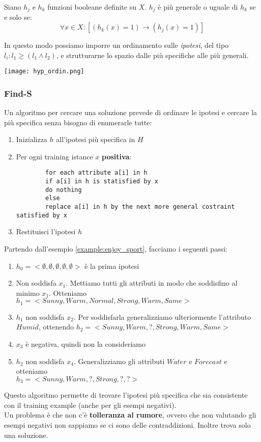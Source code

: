 \begin{definition}
	Siano $h_j$ e $h_k$ funzioni booleane definite su $X$. $h_j$ è più generale o uguale di $h_k$ se e solo se:
	\begin{equation}
		\forall x \in X : [(h_k(x) = 1) \to (h_j(x)=1)]
	\end{equation}
\end{definition}
In questo modo possiamo imporre un ordinamento sulle \textit{ipotesi}, del tipo $l_i : l_1 \geq (l_1 \land l_2)$, e strutturarne lo spazio dalle più specifiche alle più generali.
\begin{center}
	\texttt{[image: hyp\_ordin.png]}
\end{center}
\subsubsection{Find-S}
Un algoritmo per cercare una soluzione prevede di ordinare le ipotesi e cercare la più specifica senza bisogno di enumerarle tutte:
\begin{enumerate}
	\item Inizializza $h$ all'ipotesi più specifica in $H$
	\item Per ogni training istance $x$ \textbf{positiva}:
	\begin{lstlisting}
		for each attribute a[i] in h
		if a[i] in h is statisfied by x
		do nothing
		else
		replace a[i] in h by the next more general costraint satisfied by x
	\end{lstlisting}
	\item Restituisci l'ipotesi $h$
\end{enumerate}
\begin{example}
	Partendo dall'esempio \ref{example:enjoy_sport}, facciamo i seguenti passi:
	\begin{enumerate}
		\item $h_0=<\emptyset,\emptyset,\emptyset,\emptyset,\emptyset>$ è la prima ipotesi
		\item Non soddisfa $x_1$. Mettiamo tutti gli attributi in modo che soddisfino al minimo $x_1$. Otteniamo $h_1=<Sunny,Warm,Normal,Strong,Warm,Same>$
		\item $h_1$ non soddisfa $x_2$. Per soddisfarla generalizziamo ulteriormente l'attributo $Humid$, ottenendo $h_2=<Sunny,Warm,?,Strong,Warm,Same>$
		\item $x_3$ è negativa, quindi non la consideriamo
		\item $h_2$ non soddisfa $x_4$. Generalizziamo gli attributi $Water$ e $Forecast$ e otteniamo \\$h_3=<Sunny,Warm,?,Strong,?,?>$
	\end{enumerate}
\end{example}
Questo algoritmo permette di trovare l'ipotesi più specifica che sia consistente con il training example (anche per gli esempi negativi).\\
Un problema è che non c'è \textbf{tolleranza al rumore}, ovvero che non valutando gli esempi negativi non sappiamo se ci sono delle contraddizioni. Inoltre trova solo una soluzione.

